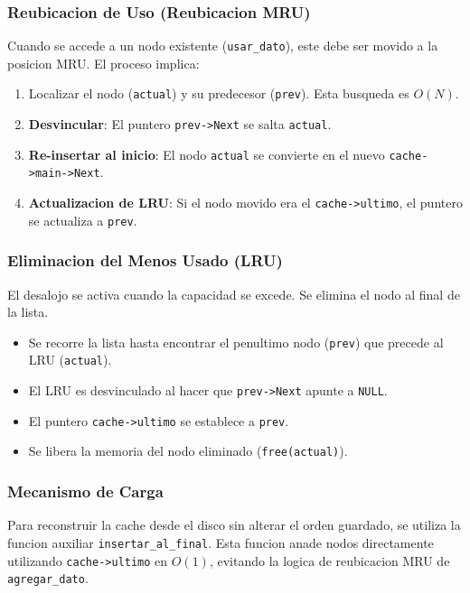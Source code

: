         \subsubsection*{Reubicacion de Uso (Reubicacion MRU)}
        Cuando se accede a un nodo existente (\texttt{usar\_dato}), este debe ser movido a la posicion MRU. El proceso implica:
        \begin{enumerate}
            \item Localizar el nodo (\texttt{actual}) y su predecesor (\texttt{prev}). Esta busqueda es $O(N)$.
            \item \textbf{Desvincular}: El puntero \texttt{prev->Next} se salta \texttt{actual}.
            \item \textbf{Re-insertar al inicio}: El nodo \texttt{actual} se convierte en el nuevo \texttt{cache->main->Next}.
            \item \textbf{Actualizacion de LRU}: Si el nodo movido era el \texttt{cache->ultimo}, el puntero se actualiza a \texttt{prev}.
        \end{enumerate}

        \subsubsection*{Eliminacion del Menos Usado (LRU)}
        El desalojo se activa cuando la capacidad se excede. Se elimina el nodo al final de la lista.
        \begin{itemize}
            \item Se recorre la lista hasta encontrar el penultimo nodo (\texttt{prev}) que precede al LRU (\texttt{actual}).
            \item El LRU es desvinculado al hacer que \texttt{prev->Next} apunte a \texttt{NULL}.
            \item El puntero \texttt{cache->ultimo} se establece a \texttt{prev}.
            \item Se libera la memoria del nodo eliminado (\texttt{free(actual)}).
        \end{itemize}

        \subsubsection*{Mecanismo de Carga}
        Para reconstruir la cache desde el disco sin alterar el orden guardado, se utiliza la funcion auxiliar \texttt{insertar\_al\_final}. 
        Esta funcion anade nodos directamente utilizando \texttt{cache->ultimo} en $O(1)$, evitando la logica de reubicacion MRU de \texttt{agregar\_dato}.

